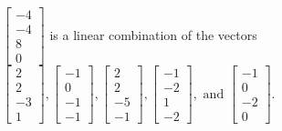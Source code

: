 \begin{exercise}
\begin{exerciseStatement}
  \end{exerciseStatement}
  \begin{exerciseAnswer}
   \(\left[\begin{array}{c}
-4 \\
-4 \\
8 \\
0
\end{array}\right]\) 
  	 is  
	a linear combination of the vectors \(\left[\begin{array}{c}
2 \\
2 \\
-3 \\
1
\end{array}\right] , \left[\begin{array}{c}
-1 \\
0 \\
-1 \\
-1
\end{array}\right] , \left[\begin{array}{c}
2 \\
2 \\
-5 \\
-1
\end{array}\right] , \left[\begin{array}{c}
-1 \\
-2 \\
1 \\
-2
\end{array}\right] , \text{ and } \left[\begin{array}{c}
-1 \\
0 \\
-2 \\
0
\end{array}\right]\).

	
  


  \end{exerciseAnswer}
\end{exercise}